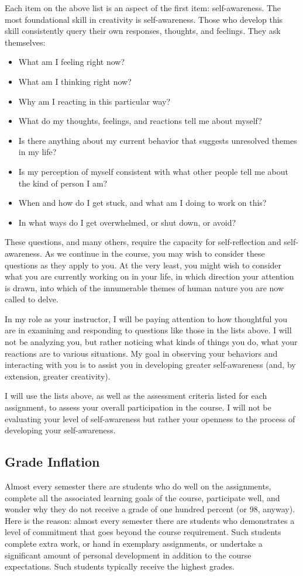 \documentclass[letterpaper,10pt,headsepline]{scrreprt}
\begin{document}
Each item on the above list is an aspect of the first item: self-awareness. The most foundational skill in creativity is self-awareness. Those who develop this skill consistently query their own responses, thoughts, and feelings. They ask themselves:

\begin{itemize}
\item What am I feeling right now?
\item What am I thinking right now?
\item Why am I reacting in this particular way?
\item What do my thoughts, feelings, and reactions tell me about myself?
\item Is there anything about my current behavior that suggests unresolved themes in my life?
\item Is my perception of myself consistent with what other people tell me about the kind of person I am?
\item When and how do I get stuck, and what am I doing to work on this?
\item In what ways do I get overwhelmed, or shut down, or avoid?
 
\end{itemize}

These questions, and many others, require the capacity for self-reflection and self-awareness. As we continue in the course, you may wish to consider these questions as they apply to you. At the very least, you might wish to consider what you are currently working on in your life, in which direction your attention is drawn, into which of the innumerable themes of human nature you are now called to delve.

In my role as your instructor, I will be paying attention to how thoughtful you are in examining and responding to questions like those in the lists above. I will not be analyzing you, but rather noticing what kinds of things you do, what your reactions are to various situations. My goal in observing your behaviors and interacting with you is to assist you in developing greater self-awareness (and, by extension, greater creativity).

I will use the lists above, as well as the assessment criteria listed for each assignment, to assess your overall participation in the course. I will not be evaluating your level of self-awareness but rather your openness to the process of developing your self-awareness.

\subsection{Grade Inflation}
Almost every semester there are students who do well on the assignments, complete all the associated learning goals of the course, participate well, and wonder why they do not receive a grade of one hundred percent (or 98, anyway). Here is the reason: almost every semester there are students who demonstrates a level of commitment that goes beyond the course requirement. Such students complete extra work, or hand in exemplary assignments, or undertake a significant amount of personal development in addition to the course expectations. Such students typically receive the highest grades.
\end{document}
